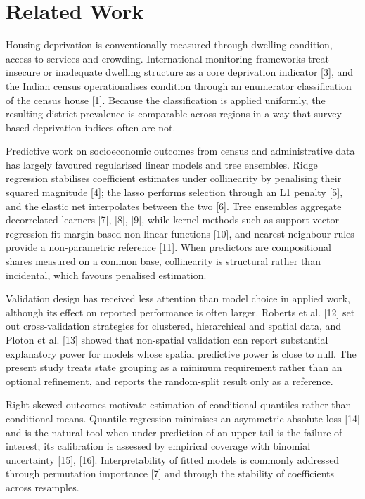 \documentclass[conference]{IEEEtran}
\begin{document}
\section{Related Work}

Housing deprivation is conventionally measured through dwelling condition, access to services and crowding. International monitoring frameworks treat insecure or inadequate dwelling structure as a core deprivation indicator [3], and the Indian census operationalises condition through an enumerator classification of the census house [1]. Because the classification is applied uniformly, the resulting district prevalence is comparable across regions in a way that survey-based deprivation indices often are not.

Predictive work on socioeconomic outcomes from census and administrative data has largely favoured regularised linear models and tree ensembles. Ridge regression stabilises coefficient estimates under collinearity by penalising their squared magnitude [4]; the lasso performs selection through an L1 penalty [5], and the elastic net interpolates between the two [6]. Tree ensembles aggregate decorrelated learners [7], [8], [9], while kernel methods such as support vector regression fit margin-based non-linear functions [10], and nearest-neighbour rules provide a non-parametric reference [11]. When predictors are compositional shares measured on a common base, collinearity is structural rather than incidental, which favours penalised estimation.

Validation design has received less attention than model choice in applied work, although its effect on reported performance is often larger. Roberts et al. [12] set out cross-validation strategies for clustered, hierarchical and spatial data, and Ploton et al. [13] showed that non-spatial validation can report substantial explanatory power for models whose spatial predictive power is close to null. The present study treats state grouping as a minimum requirement rather than an optional refinement, and reports the random-split result only as a reference.

Right-skewed outcomes motivate estimation of conditional quantiles rather than conditional means. Quantile regression minimises an asymmetric absolute loss [14] and is the natural tool when under-prediction of an upper tail is the failure of interest; its calibration is assessed by empirical coverage with binomial uncertainty [15], [16]. Interpretability of fitted models is commonly addressed through permutation importance [7] and through the stability of coefficients across resamples.
\end{document}
